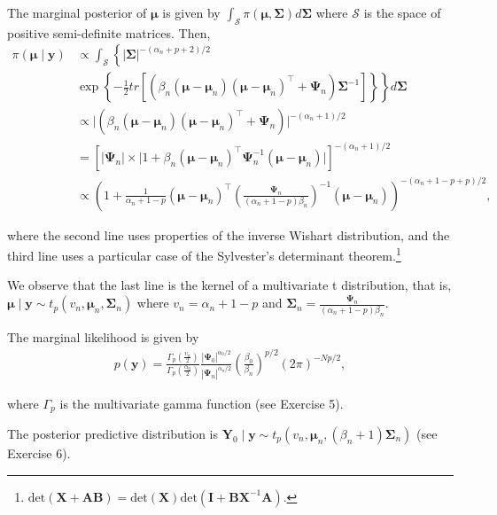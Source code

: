 \begin{enumerate}
The marginal posterior of $\bm{\mu}$ is given by $\int_{\mathcal{S}} \pi(\bm{\mu},\bm{\Sigma})d\bm{\Sigma}$ where $\mathcal{S}$ is the space of positive semi-definite matrices. Then,
{\footnotesize{
\begin{align}
	\pi(\bm{\mu}\mid \bm{y})&\propto\int_{\mathcal{S}}\left\{|\bm{\Sigma}|^{-(\alpha_n+p+2)/2}\right.\nonumber\\
	&\left. \exp\left\{-\frac{1}{2}tr\left[\left(\beta_n\left(\bm{\mu}-\bm{\mu}_n\right)\left(\bm{\mu}-\bm{\mu}_n\right)^{\top}+\bm{\Psi}_n\right)\bm{\Sigma}^{-1}\right]\right\} \right\}d\bm{\Sigma}\nonumber\\
	&\propto \big\lvert\left(\beta_n\left(\bm{\mu}-\bm{\mu}_n\right)\left(\bm{\mu}-\bm{\mu}_n\right)^{\top}+\bm{\Psi}_n\right)\big\lvert^{-(\alpha_n+1)/2}\nonumber\\
	&=\left[\big\lvert\bm{\Psi}_n\big\lvert\times \big\lvert1+\beta_n\left(\bm{\mu}-\bm{\mu}_n\right)^{\top}\bm{\Psi}_n^{-1}\left(\bm{\mu}-\bm{\mu}_n\right)\big\lvert\right]^{-(\alpha_n+1)/2}\nonumber\\
	&\propto \left(1+\frac{1}{\alpha_n+1-p}\left(\bm{\mu}-\bm{\mu}_n\right)^{\top}\left(\frac{\bm{\Psi}_n}{(\alpha_n+1-p)\beta_n}\right)^{-1}\left(\bm{\mu}-\bm{\mu}_n\right)\right)^{-(\alpha_n+1-p+p)/2},\nonumber 
\end{align}
}}

where the second line uses properties of the inverse Wishart distribution, and the third line uses a particular case of the Sylvester's determinant theorem.\footnote{$\text{det}(\boldsymbol{X}+\boldsymbol{A}\boldsymbol{B})=\text{det}(\boldsymbol{X})\text{det}(\boldsymbol{I}+\boldsymbol{B}\boldsymbol{X}^{-1}\boldsymbol{A})$.}

We observe that the last line is the kernel of a multivariate t distribution, that is, $\bm{\mu}\mid \bm{y}\sim t_p(v_n,\bm{\mu}_n,\bm{\Sigma}_n)$ where $v_n=\alpha_n+1-p$ and $\bm{\Sigma}_n=\frac{\bm{\Psi}_n}{(\alpha_n+1-p)\beta_n}$.

The marginal likelihood is given by
\begin{align}
	p(\bm{y})=\frac{\Gamma_p\left(\frac{v_n}{2}\right)}{\Gamma_p\left(\frac{\alpha_0}{2}\right)}\frac{|\bm{\Psi}_0|^{\alpha_0/2}}{|\bm{\Psi}_n|^{\alpha_n/2}}\left(\frac{\beta_0}{\beta_n}\right)^{p/2}(2\pi)^{-Np/2},\nonumber
\end{align}

where $\Gamma_p$ is the multivariate gamma function (see Exercise 5).

The posterior predictive distribution is $\bm{Y}_0\mid \bm{y}\sim t_p(v_n,\bm{\mu}_n,(\beta_n+1)\bm{\Sigma}_n)$ (see Exercise 6).


\end{enumerate}
